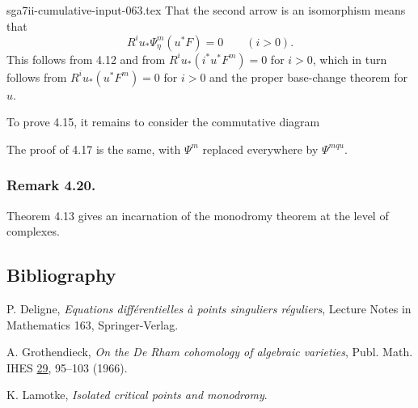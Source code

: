 \begin{filecontents*}{sga7ii-cumulative-input-063.tex}
That the second arrow is an isomorphism means that
\[
R^iu_*\Psi_\eta^m(u^*F)=0\qquad(i>0).
\]
This follows from 4.12 and from
$R^iu_*(i^*u^*F^m)=0$ for $i>0$, which in turn follows from
$R^iu_*(u^*F^m)=0$ for $i>0$ and the proper base-change theorem for
$u$.

To prove 4.15, it remains to consider the commutative diagram
\begin{center}
\end{center}
The proof of 4.17 is the same, with $\Psi^m$ replaced everywhere by
$\Psi^{mqu}$.

\subsubsection*{Remark 4.20.}
Theorem 4.13 gives an incarnation of the monodromy theorem at the
level of complexes.

\subsection*{Bibliography}

\begin{enumerate}[label={[\arabic*]},leftmargin=3em]
\item P. Deligne, \emph{Equations diff\'erentielles \`a points
  singuliers r\'eguliers}, Lecture Notes in Mathematics 163,
  Springer-Verlag.
\item A. Grothendieck, \emph{On the De Rham cohomology of algebraic
  varieties}, Publ. Math. IHES \underline{29}, 95--103 (1966).
\item K. Lamotke, \emph{Isolated critical points and monodromy}.
\end{enumerate}
\end{filecontents*}
